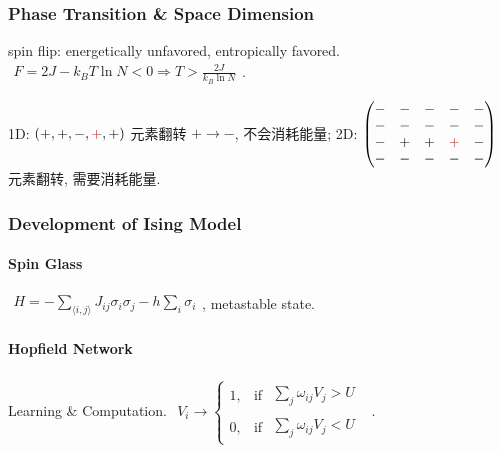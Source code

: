 \documentclass[../../main.tex]{subfiles}
\begin{document}
\subsubsection{Phase Transition \& Space Dimension}

spin flip: energetically unfavored, entropically favored. $\begin{aligned}
    F = 2J - k_{B}T\ln{N} < 0\Rightarrow T > \frac{2J}{k_{B}\ln{N}}
\end{aligned}$. 

1D: $\begin{aligned}
    (+,+,-,{\color{red}{+}},+)
\end{aligned}$ {\color{red}{染色}} 元素翻转 $+\rightarrow -$, 不会消耗能量; 2D: $\begin{aligned}
    \begin{pmatrix}
        - & - & - & - & - \\
        - & - & - & - & - \\
        - & + & + & {\color{red}{+}} & - \\
        - & - & - & - & - 
    \end{pmatrix}
\end{aligned}$ {\color{red}{染色}}元素翻转, 需要消耗能量. 

\subsubsection{Development of Ising Model}
\paragraph{Spin Glass} 
$\begin{aligned}
    H = -\sum_{\langle i,j\rangle} J_{ij}\sigma_{i}\sigma_{j} - h\sum_{i}\sigma_{i}
\end{aligned}$, metastable state. 
\paragraph{Hopfield Network} 
Learning \& Computation. $\begin{aligned}
    V_{i} \rightarrow \begin{cases}
        1,&\text{if }\begin{aligned}
            \sum_{j}\omega_{ij}V_{j}>U
        \end{aligned}\\
        0,&\text{if }\begin{aligned}
            \sum_{j}\omega_{ij}V_{j}<U
        \end{aligned}
    \end{cases}
\end{aligned}$. 
\end{document}
